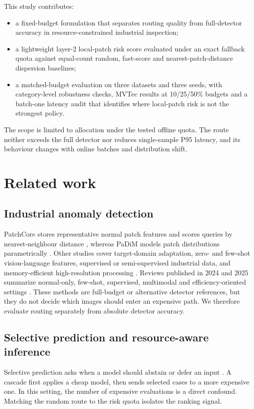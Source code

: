 \documentclass[iicol,pdflatex,sn-basic,Numbered]{sn-jnl}
\begin{document}
This study contributes:
\begin{itemize}
\item a fixed-budget formulation that separates routing quality from full-detector accuracy in resource-constrained industrial inspection;
\item a lightweight layer-2 local-patch risk score evaluated under an exact fallback quota against equal-count random, fast-score and nearest-patch-distance dispersion baselines;
\item a matched-budget evaluation on three datasets and three seeds, with category-level robustness checks, MVTec results at 10/25/50\% budgets and a batch-one latency audit that identifies where local-patch risk is not the strongest policy.
\end{itemize}

The scope is limited to allocation under the tested offline quota. The route neither exceeds the full detector nor reduces single-sample P95 latency, and its behaviour changes with online batches and distribution shift.

\section{Related work}\label{sec:related}

\subsection{Industrial anomaly detection}
PatchCore stores representative normal patch features and scores queries by nearest-neighbour distance \cite{roth2022patchcore}, whereas PaDiM models patch distributions parametrically \cite{defard2021padim}. Other studies cover target-domain adaptation, zero- and few-shot vision-language features, supervised or semi-supervised industrial data, and memory-efficient high-resolution processing \cite{liu2023simplenet,jeong2023winclip,baitieva2024segad,rolih2024divide}. Reviews published in 2024 and 2025 summarize normal-only, few-shot, supervised, multimodal and efficiency-oriented settings \cite{tao2024deepindustrial,li2025survey,mao2025rethinks}. These methods are full-budget or alternative detector references, but they do not decide which images should enter an expensive path. We therefore evaluate routing separately from absolute detector accuracy.

\subsection{Selective prediction and resource-aware inference}
Selective prediction asks when a model should abstain or defer an input \cite{geifman2017selective}. A cascade first applies a cheap model, then sends selected cases to a more expensive one. In this setting, the number of expensive evaluations is a direct confound. Matching the random route to the risk quota isolates the ranking signal.
\end{document}
